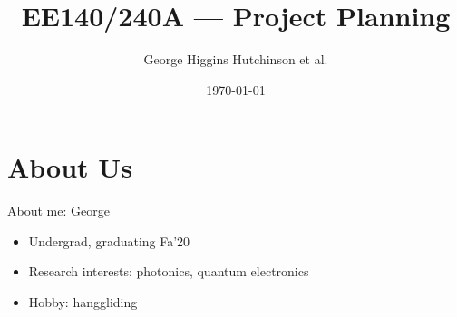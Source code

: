 \documentclass{beamer}
\title{EE140/240A --- Project Planning}
\author{George Higgins Hutchinson et al. }
\date{\today}
\begin{document}
	\begin{frame}
		\titlepage
	\end{frame}

    \section{About Us}

    \begin{frame}{About me: George}
        \begin{itemize}
            \item Undergrad, graduating Fa'20
            \item Research interests: photonics, quantum electronics
            \item Hobby: hanggliding
        \end{itemize}
    \end{frame}
\end{document}
